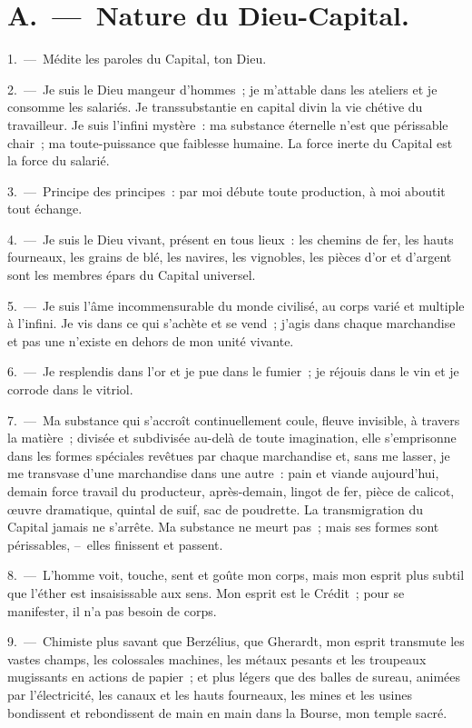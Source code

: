 \documentclass[french,twoside]{book} %
\begin{document}
\section[{A. — Nature du Dieu-Capital.}]{A. — Nature du Dieu-Capital.}
1. — Médite les paroles du Capital, ton Dieu.\par
2. — Je suis le Dieu mangeur d’hommes ; je m’attable dans les ateliers et je consomme les salariés. Je transsubstantie en capital divin la vie chétive du travailleur. Je suis l’infini mystère : ma substance éternelle n’est que périssable chair ; ma toute-puissance que faiblesse humaine. La force inerte du Capital est la force du salarié.\par
3. — Principe des principes : par moi débute toute production, à moi aboutit tout échange.\par
4. — Je suis le Dieu vivant, présent en tous lieux : les chemins de fer, les hauts fourneaux, les grains de blé, les navires, les vignobles, les pièces d’or et d’argent sont les membres épars du Capital universel.\par
5. — Je suis l’âme incommensurable du monde civilisé, au corps varié et multiple à l’infini. Je vis dans ce qui s’achète et se vend ; j’agis dans chaque marchandise et pas une n’existe en dehors de mon unité vivante.\par
6. — Je resplendis dans l’or et je pue dans le fumier ; je réjouis dans le vin et je corrode dans le vitriol.\par
7. — Ma substance qui s’accroît continuellement coule, fleuve invisible, à travers la matière ; divisée et subdivisée au-delà de toute imagination, elle s’emprisonne dans les formes spéciales revêtues par chaque marchandise et, sans me lasser, je me transvase d’une marchandise dans une autre : pain et viande aujourd’hui, demain force travail du producteur, après-demain, lingot de fer, pièce de calicot, œuvre dramatique, quintal de suif, sac de poudrette. La transmigration du Capital jamais ne s’arrête. Ma substance ne meurt pas ; mais ses formes sont périssables, – elles finissent et passent.\par
8. — L'homme voit, touche, sent et goûte mon corps, mais mon esprit plus subtil que l’éther est insaisissable aux sens. Mon esprit est le Crédit ; pour se manifester, il n’a pas besoin de corps.\par
9. — Chimiste plus savant que Berzélius, que Gherardt, mon esprit transmute les vastes champs, les colossales machines, les métaux pesants et les troupeaux mugissants en actions de papier ; et plus légers que des balles de sureau, animées par l’électricité, les canaux et les hauts fourneaux, les mines et les usines bondissent et rebondissent de main en main dans la Bourse, mon temple sacré.\par
\end{document}
